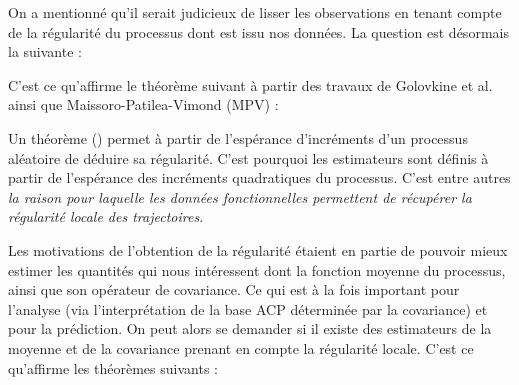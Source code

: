 
On a mentionné qu'il serait judicieux de lisser les observations en tenant compte de la régularité du processus dont est issu nos données. La question est désormais la suivante :


C'est ce qu'affirme le théorème suivant à partir des travaux de Golovkine et al. ainsi que Maissoro-Patilea-Vimond (MPV) :

\begin{thm*}
    \noindent{}
    \label{thm*:regularite_locale}
\end{thm*}
\begin{rem}
    Un théorème () permet à partir de l'espérance d'incréments d'un processus aléatoire de déduire sa régularité.
    C'est pourquoi les estimateurs sont définis à partir de l'espérance des incréments quadratiques du processus. C'est entre autres \emph{la raison pour laquelle les données fonctionnelles permettent de récupérer la régularité locale des trajectoires}.

    \label{rem:kolmo_continuite}
\end{rem}

Les motivations de l'obtention de la régularité étaient en partie de pouvoir mieux estimer les quantités qui nous intéressent dont la fonction moyenne du processus, ainsi que son opérateur de covariance. Ce qui est à la fois important pour l'analyse (via l'interprétation de la base ACP déterminée par la covariance) et pour la prédiction. On peut alors se demander si il existe des estimateurs de la moyenne et de la covariance prenant en compte la régularité locale. C'est ce qu'affirme les théorèmes suivants :


\begin{thm*}
    \noindent{}

    \label{thm*:estimation_adaptative}
\end{thm*}

